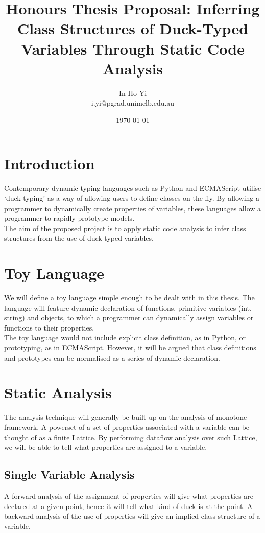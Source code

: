 \documentclass[a4paper,12pt,twocolumn]{article}
\begin{document}
\title{Honours Thesis Proposal: Inferring Class Structures of Duck-Typed Variables Through Static Code Analysis}
\author{In-Ho Yi\\
i.yi@pgrad.unimelb.edu.au
}
\date{\today}
\maketitle

\section{Introduction}
Contemporary dynamic-typing languages such as Python and ECMAScript utilise `duck-typing' as a way of allowing users to define classes on-the-fly. By allowing a programmer to dynamically create properties of variables, these languages allow a programmer to rapidly prototype models.\\
The aim of the proposed project is to apply static code analysis to infer class structures from the use of duck-typed variables. 
\section{Toy Language}
We will define a toy language simple enough to be dealt with in this thesis. The language will feature dynamic declaration of functions, primitive variables (int, string) and objects, to which a programmer can dynamically assign variables or functions to their properties.\\
The toy language would not include explicit class definition, as in Python, or prototyping, as in ECMAScript. However, it will be argued that class definitions and prototypes can be normalised as a series of dynamic declaration.\\
\section{Static Analysis}
The analysis technique will generally be built up on the analysis of monotone framework. A powerset of a set of properties associated with a variable can be thought of as a finite Lattice. By performing dataflow analysis over such Lattice, we will be able to tell what properties are assigned to a variable.\\
\subsection{Single Variable Analysis}
A forward analysis of the assignment of properties will give what properties are declared at a given point, hence it will tell what kind of duck is at the point. A backward analysis of the use of properties will give an implied class structure of a variable.\\
\end{document}
